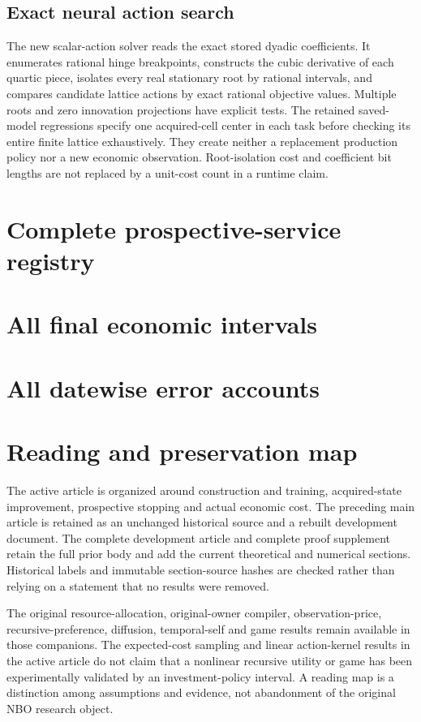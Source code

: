 \subsection{Exact neural action search}
The new scalar-action solver reads the exact stored dyadic coefficients. It enumerates rational hinge breakpoints, constructs the cubic derivative of each quartic piece, isolates every real stationary root by rational intervals, and compares candidate lattice actions by exact rational objective values. Multiple roots and zero innovation projections have explicit tests. The retained saved-model regressions specify one acquired-cell center in each task before checking its entire finite lattice exhaustively. They create neither a replacement production policy nor a new economic observation. Root-isolation cost and coefficient bit lengths are not replaced by a unit-cost count in a runtime claim.

\section{Complete prospective-service registry}\label{supp:registry56}

\section{All final economic intervals}\label{supp:costs56}

\section{All datewise error accounts}\label{supp:gaps56}


\section{Reading and preservation map}\label{supp:preservation56}
The active article is organized around construction and training, acquired-state improvement, prospective stopping and actual economic cost. The preceding main article is retained as an unchanged historical source and a rebuilt development document. The complete development article and complete proof supplement retain the full prior body and add the current theoretical and numerical sections. Historical labels and immutable section-source hashes are checked rather than relying on a statement that no results were removed.

The original resource-allocation, original-owner compiler, observation-price, recursive-preference, diffusion, temporal-self and game results remain available in those companions. The expected-cost sampling and linear action-kernel results in the active article do not claim that a nonlinear recursive utility or game has been experimentally validated by an investment-policy interval. A reading map is a distinction among assumptions and evidence, not abandonment of the original NBO research object.
